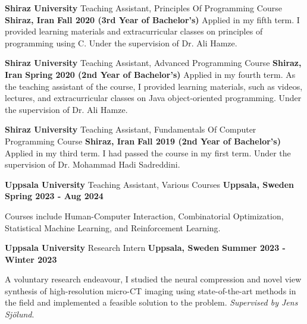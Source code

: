 \begin{cventries}
{    \cventry
    {\textbf{Shiraz University}} %
    {Teaching Assistant, Principles Of Programming Course} %
    {\textbf{Shiraz, Iran}} %
    {\textbf{Fall 2020 (3rd Year of Bachelor’s)}} %
    {
        Applied in my fifth term. I provided learning materials and extracurricular classes on principles of programming using C. Under the supervision of Dr. Ali Hamze.
    }

    \cventry
    {\textbf{Shiraz University}} %
    {Teaching Assistant, Advanced Programming Course} %
    {\textbf{Shiraz, Iran}} %
    {\textbf{Spring 2020 (2nd Year of Bachelor’s)}} %
    {
        Applied in my fourth term. As the teaching assistant of the course, I provided learning materials, such as videos, lectures, and extracurricular classes on Java object-oriented programming. Under the supervision of Dr. Ali Hamze.
    }

    \cventry
    {\textbf{Shiraz University}} %
    {Teaching Assistant, Fundamentals Of Computer Programming Course} %
    {\textbf{Shiraz, Iran}} %
    {\textbf{Fall 2019 (2nd Year of Bachelor’s)}} %
    {
        Applied in my third term. I had passed the course in my first term. Under the supervision of Dr. Mohammad Hadi Sadreddini.
    }
}
{ 
    \cventry
    {\textbf{Uppsala University}} %
    {Teaching Assistant, Various Courses} %
    {\textbf{Uppsala, Sweden}} %
    {\textbf{Spring 2023 - Aug 2024}} %
    {
      \begin{cvitems}
        \item Courses include Human-Computer Interaction, Combinatorial Optimization, Statistical Machine Learning, and Reinforcement Learning.
      \end{cvitems}
    }
    
    \cventry
    {\textbf{Uppsala University}} %
    {Research Intern} %
    {\textbf{Uppsala, Sweden}} %
    {\textbf{Summer 2023 - Winter 2023}} %
    {
      \begin{cvitems}
        \item A voluntary research endeavour, I studied the neural compression and novel view synthesis of high-resolution micro-CT imaging using state-of-the-art methods in the field and implemented a feasible solution to the problem. \emph{Supervised by Jens Sjölund}.
      \end{cvitems}
    }

}
\end{cventries}
